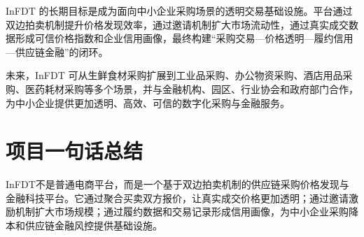 \documentclass[UTF8,11pt]{ctexart}
\begin{document}
InFDT 的长期目标是成为面向中小企业采购场景的透明交易基础设施。平台通过双边拍卖机制提升价格发现效率，通过邀请机制扩大市场流动性，通过真实成交数据形成可信价格指数和企业信用画像，最终构建“采购交易—价格透明—履约信用—供应链金融”的闭环。

未来，InFDT 可从生鲜食材采购扩展到工业品采购、办公物资采购、酒店用品采购、医药耗材采购等多个场景，并与金融机构、园区、行业协会和政府部门合作，为中小企业提供更加透明、高效、可信的数字化采购与金融服务。

\section{项目一句话总结}

InFDT不是普通电商平台，而是一个基于双边拍卖机制的供应链采购价格发现与金融科技平台。它通过聚合买卖双方报价，让真实成交价格更加透明；通过邀请激励机制扩大市场规模；通过履约数据和交易记录形成信用画像，为中小企业采购降本和供应链金融风控提供基础设施。
\end{document}
